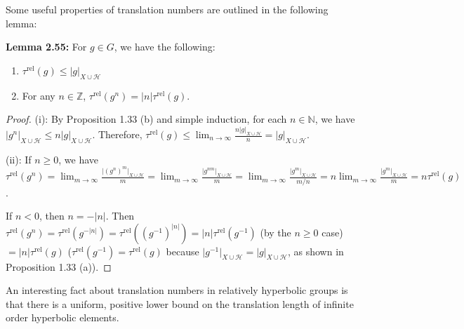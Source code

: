 \documentclass[12pt]{article}
\newcommand{\vs}{\vskip10pt}
\begin{document}
	\vs 
	
	Some useful properties of translation numbers are outlined in the following lemma: 
	
	\vs 
	
	\textbf{Lemma 2.55: } For $g \in G$, we have the following: 
	
	\begin{enumerate} [label = (\roman*)]
		\item $\tau^{\text{rel}}(g) \leq \vert g \vert_{X \cup \mathcal{H}}$
		\item For any $n \in \mathbb{Z}$, $\tau^{\text{rel}}(g^n) = \vert n \vert \tau^{\text{rel}}(g)$.
	\end{enumerate}

	\begin{proof}
		
	(i): By Proposition 1.33 (b) and simple induction, for each $n \in \mathbb{N}$, we have $\vert g^n \vert_{X \cup \mathcal{H}} \leq n \vert g \vert_{X \cup \mathcal{H}}$. Therefore, $\tau^{\text{rel}}(g) \leq \lim_{n \rightarrow \infty} \frac{n \vert g \vert_{X \cup \mathcal{H}}}{n} = \vert g \vert_{X \cup \mathcal{H}}$. 
	
	\vs 
	
	(ii): If $n \geq 0$, we have $\tau^{\text{rel}}(g^n) = \lim_{m \rightarrow \infty} \frac{\vert (g^{n})^m \vert_{X \cup \mathcal{H}}}{m} = \lim_{m \rightarrow \infty} \frac{\vert g^{nm} \vert_{X \cup \mathcal{H}}}{m} = \lim_{m \rightarrow \infty} \frac{\vert g^{m} \vert_{X \cup \mathcal{H}}}{m/n} = n \lim_{m \rightarrow \infty} \frac{\vert g^{m} \vert_{X \cup \mathcal{H}}}{m} = n \tau^{\text{rel}}(g)$.
	
	\vs 
	
	If $n < 0$, then $n = -\vert n \vert$. Then $\tau^{\text{rel}}(g^n) = \tau^{\text{rel}}(g^{-\vert n \vert}) = \tau^{\text{rel}}((g^{-1})^{\vert n \vert}) = \vert n \vert \tau^{\text{rel}}(g^{-1})$ (by the $n \geq 0$ case) $= \vert n \vert \tau^{\text{rel}}(g)$ ($\tau^{\text{rel}}(g^{-1}) = \tau^{\text{rel}}(g)$ because $\vert g^{-1} \vert_{X \cup \mathcal{H}} = \vert g \vert_{X \cup \mathcal{H}}$, as shown in Proposition 1.33 (a)). 
		
	\end{proof}
	
	\vs 
	
	An interesting fact about translation numbers in relatively hyperbolic groups is that there is a uniform, positive lower bound on the translation length of infinite order hyperbolic elements. 
	
\end{document}
